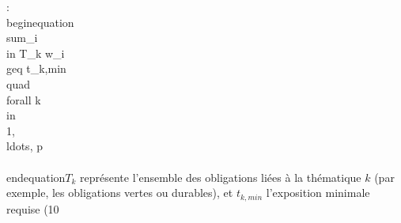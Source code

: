 :\n\n\\begin{equation}\n\\sum_{i \\in T_k} w_i \\geq t_{k,min} \\quad \\forall k \\in \\{1, \\ldots, p\\}\n\\end{equation}\n{} $T_k$ représente l'ensemble des obligations liées à la thématique $k$ (par exemple, les obligations vertes ou durables), et $t_{k,min}$ l'exposition minimale requise (10%